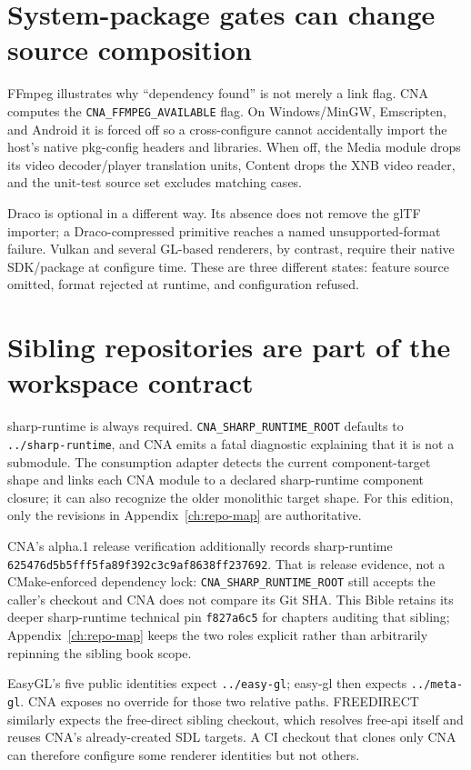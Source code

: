 \section{System-package gates can change source composition}

FFmpeg illustrates why “dependency found” is not merely a link flag.  CNA computes the
\texttt{CNA\_FFMPEG\_AVAILABLE} flag.  On Windows/MinGW, Emscripten, and Android it is forced off
so a
cross-configure cannot accidentally import the host's native pkg-config headers and libraries.
When off, the Media module drops its video decoder/player translation units, Content drops the XNB
video reader, and the unit-test source set excludes matching cases.

Draco is optional in a different way.  Its absence does not remove the glTF importer; a
Draco-compressed primitive reaches a named unsupported-format failure.  Vulkan and several GL-based
renderers, by contrast, require their native SDK/package at configure time.  These are three
different states: feature source omitted, format rejected at runtime, and configuration refused.

\section{Sibling repositories are part of the workspace contract}

sharp-runtime is always required.  \texttt{CNA\_SHARP\_RUNTIME\_ROOT} defaults to
\texttt{../sharp-runtime}, and CNA emits a fatal diagnostic explaining that it is not a submodule.
The consumption adapter detects the current component-target shape and links each CNA module to a
declared sharp-runtime component closure; it can also recognize the older monolithic target shape.
For this edition, only the revisions in Appendix~\ref{ch:repo-map} are authoritative.

CNA's alpha.1 release verification additionally records sharp-runtime
\texttt{625476d5b5fff5fa89f392c3c9af8638\allowbreak ff237692}. That is release evidence, not a CMake-enforced
dependency lock: \texttt{CNA\_SHARP\_RUNTIME\_ROOT} still accepts the caller's checkout and CNA
does not compare its Git SHA. This Bible retains its deeper sharp-runtime technical pin
\texttt{f827a6c5} for chapters auditing that sibling; Appendix~\ref{ch:repo-map} keeps the two
roles explicit rather than arbitrarily repinning the sibling book scope.

EasyGL's five public identities expect \texttt{../easy-gl}; easy-gl then expects
\texttt{../meta-gl}.  CNA exposes no override for those two relative paths.  FREEDIRECT similarly
expects the free-direct sibling checkout, which resolves free-api itself and reuses CNA's
already-created SDL
targets.  A CI checkout that clones only CNA can therefore configure some renderer identities but
not others.

